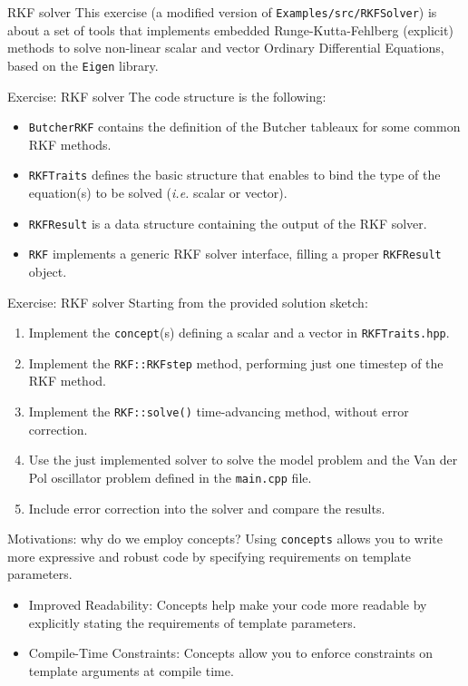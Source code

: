 \documentclass[10pt,aspectratio=169]{beamer}
\begin{document}
\begin{frame}{RKF solver}
This exercise (a modified version of \texttt{Examples/src/RKFSolver}) is about a set of tools that implements embedded Runge-Kutta-Fehlberg (explicit) methods to solve non-linear scalar and vector Ordinary Differential Equations, based on the \texttt{Eigen} library.
\end{frame}

\begin{frame}{Exercise: RKF solver}
The code structure is the following:
\begin{itemize}
\item \texttt{ButcherRKF} contains the definition of the Butcher tableaux for some common RKF methods.
\item \texttt{RKFTraits} defines the basic structure that enables to bind the type of the equation(s) to be solved (\textit{i.e.} scalar or vector).
\item \texttt{RKFResult} is a data structure containing the output of the RKF solver.
\item \texttt{RKF} implements a generic RKF solver interface, filling a proper \texttt{RKFResult} object.
\end{itemize}
\end{frame}

\begin{frame}{Exercise: RKF solver}
Starting from the provided solution sketch:
\begin{enumerate}
\item Implement the \texttt{concept}(s) defining a scalar and a vector in \texttt{RKFTraits.hpp}.
\item Implement the \texttt{RKF::RKFstep} method, performing just one timestep of the RKF method.
\item Implement the \texttt{RKF::solve()} time-advancing method, without error correction.
\item Use the just implemented solver to solve the model problem and the Van der Pol oscillator problem defined in the \texttt{main.cpp} file.
\item Include error correction into the solver and compare the results.
\end{enumerate}
\end{frame}

\begin{frame}{Motivations: why do we 
	employ concepts?}
	Using \texttt{concepts} allows you to write more expressive and robust code by specifying requirements on template parameters.
	
	\begin{itemize}
		\item Improved Readability: Concepts help make your code more readable by explicitly stating the requirements of template parameters.
		\item Compile-Time Constraints: Concepts allow you to enforce constraints on template arguments at compile time. 
	\end{itemize}
	
\end{frame}
\end{document}
